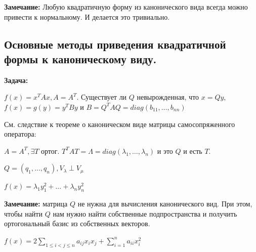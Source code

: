\textbf{Замечание:} Любую квадратичную форму из канонического вида всегда можно привести к нормальному. И делается это тривиально.

\newpage

\subsection{Основные методы приведения квадратичной формы к каноническому виду.}

\textbf{Задача:}

$f(x) = x^T Ax,A = A^T$. Существует ли $Q$ невырожденная, что $x = Qy$, $f(x) = g(y) = y^TBy$ и $B = Q^TAQ = diag(b_{11},\ldots, b_{nn})$



См. следствие к теореме о каноническом виде матрицы самосопряженного оператора:

$A = A^T, \exists T$ ортог. $T^T  A T = \Lambda = diag(\lambda_1,\ldots,\lambda_n)$ и это $Q$ и есть $T$.

$Q = (q_1,\ldots,q_n), V_\lambda \perp V_\mu$

$f(x) = \lambda_1 y_1^2 + \ldots + \lambda_n y_n^2$

\textbf{Замечание:} матрица $Q$ не нужна для вычисления канонического вид. При этом, чтобы найти $Q$ нам нужно найти собственные подпространства и получить ортогональный базис из собственных векторов.


$f(x) = 2 \sum\limits_{1 \leq i <j \leq n}a_{ij}x_i x_j + \sum\limits_{i=1}^n a_{ii}x_i^2$

